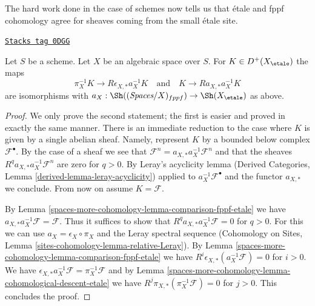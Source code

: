 The hard work done in the case of schemes now tells us that
\'etale and fppf cohomology agree for sheaves coming from the
small \'etale site.

\begin{lemma}
\label{spaces-more-cohomology-lemma-cohomological-descent-etale-fppf}
\href{https://stacks.math.columbia.edu/tag/0DGG}{\texttt{Stacks tag 0DGG}}

Let $S$ be a scheme. Let $X$ be an algebraic space over $S$.
For $K \in D^+(X_\etale)$ the maps
$$
\pi_X^{-1}K \longrightarrow R\epsilon_{X, *}a_X^{-1}K
\quad\text{and}\quad
K \longrightarrow Ra_{X, *}a_X^{-1}K
$$
are isomorphisms with
$a_X : \Sh((\textit{Spaces}/X)_{fppf}) \to \Sh(X_\etale)$ as above.
\end{lemma}

\begin{proof}
We only prove the second statement; the first is easier and proved in exactly
the same manner.
There is an immediate reduction to the case where
$K$ is given by a single abelian sheaf. Namely, represent $K$
by a bounded below complex $\mathcal{F}^\bullet$. By the case of a
sheaf we see that
$\mathcal{F}^n = a_{X, *} a_X^{-1} \mathcal{F}^n$
and that the sheaves $R^qa_{X, *}a_X^{-1}\mathcal{F}^n$
are zero for $q > 0$. By Leray's acyclicity lemma
(Derived Categories, Lemma \ref{derived-lemma-leray-acyclicity})
applied to $a_X^{-1}\mathcal{F}^\bullet$
and the functor $a_{X, *}$ we conclude. From now on assume $K = \mathcal{F}$.

\medskip\noindent
By Lemma \ref{spaces-more-cohomology-lemma-comparison-fppf-etale} we have
$a_{X, *}a_X^{-1}\mathcal{F} = \mathcal{F}$. Thus it suffices to show that
$R^qa_{X, *}a_X^{-1}\mathcal{F} = 0$ for $q > 0$.
For this we can use $a_X = \epsilon_X \circ \pi_X$ and
the Leray spectral sequence
(Cohomology on Sites, Lemma \ref{sites-cohomology-lemma-relative-Leray}).
By Lemma \ref{spaces-more-cohomology-lemma-comparison-fppf-etale}
we have $R^i\epsilon_{X, *}(a_X^{-1}\mathcal{F}) = 0$ for $i > 0$.
We have
$\epsilon_{X, *}a_X^{-1}\mathcal{F} = \pi_X^{-1}\mathcal{F}$
and by Lemma \ref{spaces-more-cohomology-lemma-cohomological-descent-etale} we have
$R^j\pi_{X, *}(\pi_X^{-1}\mathcal{F}) = 0$ for $j > 0$.
This concludes the proof.
\end{proof}

